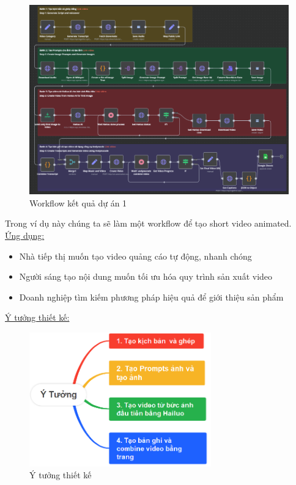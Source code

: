 \begin{figure}[h]
    \centering
    \includegraphics[width=1\textwidth]{images/Da1-01.png}
    \caption{Workflow kết quả dự án 1}
    
\end{figure}

Trong ví dụ này chúng ta sẽ làm một workflow để tạo short video animated. \\

\underline{Ứng dụng:}\\
\begin{itemize}[label=-]
    \item Nhà tiếp thị muốn tạo video quảng cáo tự động, nhanh chóng
    \item Người sáng tạo nội dung muốn tối ưu hóa quy trình sản xuất video
    \item Doanh nghiệp tìm kiếm phương pháp hiệu quả để giới thiệu sản phẩm 
\end{itemize}


\underline{Ý tưởng thiết kế:}\\
\begin{figure}[h]
    \centering
    \includegraphics[width=0.7\textwidth]{images/Da1-02.png}
    \caption{Ý tưởng thiết kế}
    
\end{figure}


